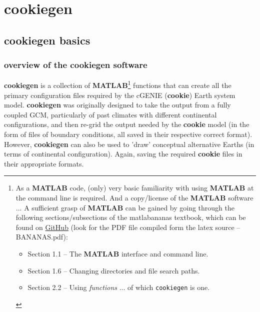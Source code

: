 
\cleardoublepage


\chapter{cookiegen}\label{ch:cookiegen}

\hfill \break
\vspace{24mm}

\newpage

\section{cookiegen basics}


\subsection{overview of the cookiegen software}

\textbf{cookiegen} is a collection of \textbf{MATLAB}\footnote{As a \textbf{MATLAB} code, (only) very basic familiarity with using \textbf{MATLAB} at the command line is required. And a copy/license of the \textbf{MATLAB} software ... A sufficient grasp of \textbf{MATLAB} can be gained by going through the following sections/subsections of the \textsf{matlabananas} textbook, which can be found on \href{https://github.com/derpycode/matlabananas}{GitHub} (look for the PDF file compiled form the latex source -- \textsf{BANANAS.pdf}):
\vspace{1mm}
\begin{itemize}[noitemsep]
\item Section 1.1 -- The \textbf{MATLAB} interface and command line.
\item Section 1.6 -- Changing directories and file search paths.
\item Section 2.2 -- Using \textit{functions} ... of which \texttt{cookiegen} is one.
\end{itemize}
} functions that can create all the primary configuration files required by the cGENIE (\textbf{cookie}) Earth system model. \textbf{cookiegen} was originally designed to take the output from a fully coupled GCM, particularly of past climates with different continental configurations, and then re-grid the output needed by the \textbf{cookie} model (in the form of files of boundary conditions, all  saved  in their respective correct format). However, \textbf{cookiegen} can also be used to 'draw' conceptual alternative Earths (in terms of continental configuration). Again, saving the required \textbf{cookie} files in their appropriate formats.

